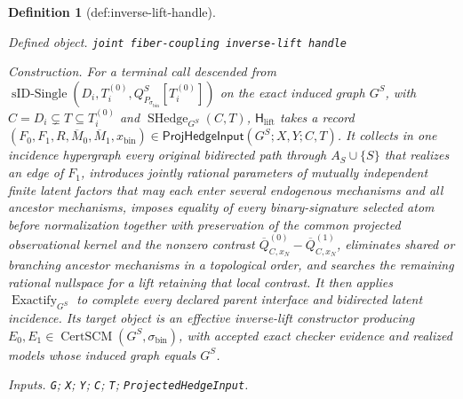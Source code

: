 \documentclass{article}
\newtheorem{definition}{Definition}
\begin{document}
\begin{definition}[def:inverse-lift-handle]\label{def:inverse-lift-handle}
\par\smallskip\noindent\emph{Defined object.} \texttt{joint fiber-\allowbreak{}coupling inverse-\allowbreak{}lift handle}
\par\smallskip\noindent\emph{Construction.} For a terminal call descended from \(\operatorname{sID\text{-}Single}(D_i,T_i^{(0)},Q_{P_{\sigma_{\mathrm{bin}}}}^S[T_i^{(0)}])\) on the exact induced graph \(G^S\), with \(C=D_i\subsetneq T\subseteq T_i^{(0)}\) and \(\operatorname{SHedge}_{G^S}(C,T)\), \(\mathsf H_{\mathrm{lift}}\) takes a record \((F_0,F_1,R,\overline M_0,\overline M_1,x_{\mathrm{bin}})\in\mathsf{ProjHedgeInput}(G^S;X,Y;C,T)\). It collects in one incidence hypergraph every original bidirected path through \(A_S\cup\{S\}\) that realizes an edge of \(F_1\), introduces jointly rational parameters of mutually independent finite latent factors that may each enter several endogenous mechanisms and all ancestor mechanisms, imposes equality of every binary-signature selected atom before normalization together with preservation of the common projected observational kernel and the nonzero contrast \(\overline Q^{(0)}_{C,x_N}-\overline Q^{(1)}_{C,x_N}\), eliminates shared or branching ancestor mechanisms in a topological order, and searches the remaining rational nullspace for a lift retaining that local contrast. It then applies \(\operatorname{Exactify}_{G^S}\) to complete every declared parent interface and bidirected latent incidence. Its target object is an effective inverse-lift constructor producing \(E_0,E_1\in\operatorname{CertSCM}(G^S,\sigma_{\mathrm{bin}})\), with accepted exact checker evidence and realized models whose induced graph equals \(G^S\).
\par\smallskip\noindent\emph{Inputs.} \texttt{G}; \texttt{X}; \texttt{Y}; \texttt{C}; \texttt{T}; \texttt{ProjectedHedgeInput}.
\end{definition}
\end{document}
